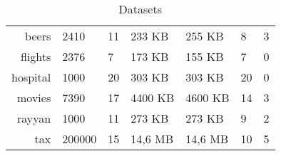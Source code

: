 \begin{table}[!t]
\caption{\label{tab:datasets_table}Datasets}
\centering
\begin{tabular}{r|K|K|K|K|H|K}
\toprule
 &  &  &   &   &  & \\
\midrule
beers                & 2410     & 11     &    233 \textsc{KB}              & 255 \textsc{KB}                    & 8                    & 3                    \\
flights              & 2376     & 7      &    173 \textsc{KB}              & 155 \textsc{KB}                    & 7                    & 0                    \\
hospital             & 1000     & 20     &    303 \textsc{KB}              & 303 \textsc{KB}                     & 20                   & 0                     \\
movies               & 7390     & 17     &    4400 \textsc{KB}              & 4600 \textsc{KB}                    & 14                   & 3                    \\
rayyan               & 1000     & 11     &    273 \textsc{KB}              & 273 \textsc{KB}                    & 9                    & 2                     \\
tax                  & 200000   & 15     &    14,6 \textsc{MB}             & 14,6 \textsc{MB}                   & 10                   & 5                    \\
\bottomrule    
\end{tabular}
\end{table}

